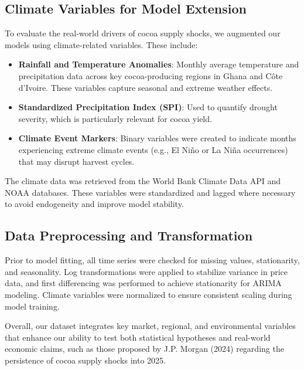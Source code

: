 \subsection{Climate Variables for Model Extension}

To evaluate the real-world drivers of cocoa supply shocks, we augmented our models using climate-related variables. These include:

\begin{itemize}
  \item \textbf{Rainfall and Temperature Anomalies}: Monthly average temperature and precipitation data across key cocoa-producing regions in Ghana and Côte d'Ivoire. These variables capture seasonal and extreme weather effects.
  \item \textbf{Standardized Precipitation Index (SPI)}: Used to quantify drought severity, which is particularly relevant for cocoa yield.
  \item \textbf{Climate Event Markers}: Binary variables were created to indicate months experiencing extreme climate events (e.g., El Niño or La Niña occurrences) that may disrupt harvest cycles.
\end{itemize}

The climate data was retrieved from the World Bank Climate Data API and NOAA databases. These variables were standardized and lagged where necessary to avoid endogeneity and improve model stability.

\subsection{Data Preprocessing and Transformation}

Prior to model fitting, all time series were checked for missing values, stationarity, and seasonality. Log transformations were applied to stabilize variance in price data, and first differencing was performed to achieve stationarity for ARIMA modeling. Climate variables were normalized to ensure consistent scaling during model training.

Overall, our dataset integrates key market, regional, and environmental variables that enhance our ability to test both statistical hypotheses and real-world economic claims, such as those proposed by J.P. Morgan (2024) regarding the persistence of cocoa supply shocks into 2025.

